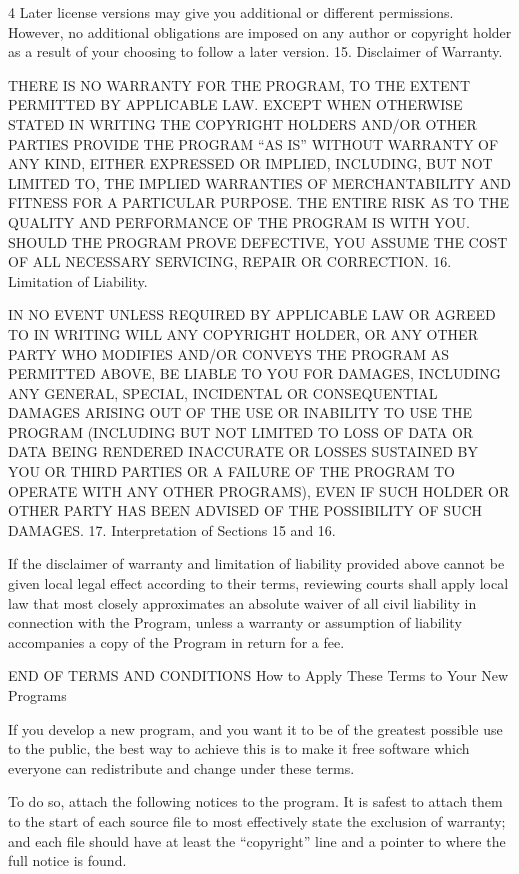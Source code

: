 \documentclass[fontsize=11pt,paper=A4,BCOR=12mm,DIV=13,open=any,listof=totoc,toc=flat]{scrbook}
\begin{document}
{\begin{multicols}{4}
Later license versions may give you additional or different permissions. However, no additional obligations are imposed on any author or copyright holder as a result of your choosing to follow a later version.
15. Disclaimer of Warranty.

THERE IS NO WARRANTY FOR THE PROGRAM, TO THE EXTENT PERMITTED BY APPLICABLE LAW. EXCEPT WHEN OTHERWISE STATED IN WRITING THE COPYRIGHT HOLDERS AND/OR OTHER PARTIES PROVIDE THE PROGRAM “AS IS” WITHOUT WARRANTY OF ANY KIND, EITHER EXPRESSED OR IMPLIED, INCLUDING, BUT NOT LIMITED TO, THE IMPLIED WARRANTIES OF MERCHANTABILITY AND FITNESS FOR A PARTICULAR PURPOSE. THE ENTIRE RISK AS TO THE QUALITY AND PERFORMANCE OF THE PROGRAM IS WITH YOU. SHOULD THE PROGRAM PROVE DEFECTIVE, YOU ASSUME THE COST OF ALL NECESSARY SERVICING, REPAIR OR CORRECTION.
16. Limitation of Liability.

IN NO EVENT UNLESS REQUIRED BY APPLICABLE LAW OR AGREED TO IN WRITING WILL ANY COPYRIGHT HOLDER, OR ANY OTHER PARTY WHO MODIFIES AND/OR CONVEYS THE PROGRAM AS PERMITTED ABOVE, BE LIABLE TO YOU FOR DAMAGES, INCLUDING ANY GENERAL, SPECIAL, INCIDENTAL OR CONSEQUENTIAL DAMAGES ARISING OUT OF THE USE OR INABILITY TO USE THE PROGRAM (INCLUDING BUT NOT LIMITED TO LOSS OF DATA OR DATA BEING RENDERED INACCURATE OR LOSSES SUSTAINED BY YOU OR THIRD PARTIES OR A FAILURE OF THE PROGRAM TO OPERATE WITH ANY OTHER PROGRAMS), EVEN IF SUCH HOLDER OR OTHER PARTY HAS BEEN ADVISED OF THE POSSIBILITY OF SUCH DAMAGES.
17. Interpretation of Sections 15 and 16.

If the disclaimer of warranty and limitation of liability provided above cannot be given local legal effect according to their terms, reviewing courts shall apply local law that most closely approximates an absolute waiver of all civil liability in connection with the Program, unless a warranty or assumption of liability accompanies a copy of the Program in return for a fee.

END OF TERMS AND CONDITIONS
How to Apply These Terms to Your New Programs

If you develop a new program, and you want it to be of the greatest possible use to the public, the best way to achieve this is to make it free software which everyone can redistribute and change under these terms.

To do so, attach the following notices to the program. It is safest to attach them to the start of each source file to most effectively state the exclusion of warranty; and each file should have at least the “copyright” line and a pointer to where the full notice is found.


\end{multicols}}
\end{document}
